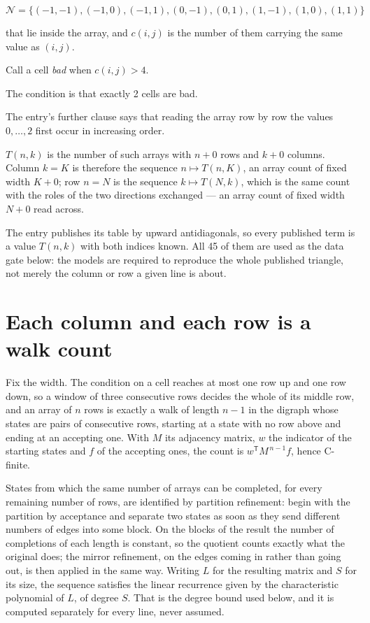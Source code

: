 \documentclass[11pt]{article}
\theoremstyle{definition}
\begin{document}
\[\mathcal{N} = \{(-1,-1), (-1,0), (-1,1), (0,-1), (0,1), (1,-1), (1,0), (1,1)\}\]

that lie inside the array, and $c(i,j)$ is the number of them carrying the same value as $(i,j)$.

Call a cell {\itshape bad} when $c(i,j) > 4$.

The condition is that exactly 2 cells are bad.

The entry's further clause says that reading the array row by row the values $0,\dots,2$ first occur in increasing order.

$T(n,k)$ is the number of such arrays with $n + 0$ rows and $k + 0$ columns. Column $k = K$ is therefore the sequence $n \mapsto T(n,K)$, an array count of fixed width $K + 0$; row $n = N$ is the sequence $k \mapsto T(N,k)$, which is the same count with the roles of the two directions exchanged --- an array count of fixed width $N + 0$ read across.

The entry publishes its table by upward antidiagonals, so every published term is a value $T(n,k)$ with both indices known. All 45 of them are used as the data gate below: the models are required to reproduce the whole published triangle, not merely the column or row a given line is about.

\section{Each column and each row is a walk count}

Fix the width. The condition on a cell reaches at most one row up and one row down, so a window of three consecutive rows decides the whole of its middle row, and an array of $n$ rows is exactly a walk of length $n-1$ in the digraph whose states are pairs of consecutive rows, starting at a state with no row above and ending at an accepting one. With $M$ its adjacency matrix, $w$ the indicator of the starting states and $f$ of the accepting ones, the count is $w^{\mathsf T}M^{\,n-1}f$, hence C-finite.

States from which the same number of arrays can be completed, for every remaining number of rows, are identified by partition refinement: begin with the partition by acceptance and separate two states as soon as they send different numbers of edges into some block. On the blocks of the result the number of completions of each length is constant, so the quotient counts exactly what the original does; the mirror refinement, on the edges coming in rather than going out, is then applied in the same way. Writing $L$ for the resulting matrix and $S$ for its size, the sequence satisfies the linear recurrence given by the characteristic polynomial of $L$, of degree $S$. That is the degree bound used below, and it is computed separately for every line, never assumed.
\end{document}
